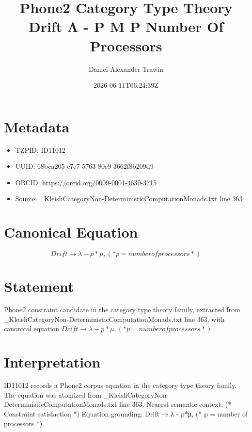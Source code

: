 \documentclass[11pt]{article}
\title{Phone2 Category Type Theory Drift Λ - P Μ P Number Of Processors}
\author{Daniel Alexander Trawin}
\date{2026-06-11T06:24:39Z}
\begin{document}
\maketitle
\section*{Metadata}
\begin{itemize}
\item TZPID: ID11012
\item UUID: 68bca205-c7c7-5763-80e9-3662f8b209d9
\item ORCID: \url{https://orcid.org/0009-0001-4630-3715}
\item Source: _KleisliCategoryNon-DeterministicComputationMonads.txt line 363
\end{itemize}
\section*{Canonical Equation}
\[
Drift → λ - p*μ, (* p = number of processors *)
\]
\section*{Statement}
Phone2 constraint candidate in the category type theory family, extracted from _KleisliCategoryNon-DeterministicComputationMonads.txt line 363, with canonical equation $Drift → λ - p*μ, (* p = number of processors *)$.
\section*{Interpretation}
ID11012 records a Phone2 corpus equation in the category type theory family. The equation was atomized from _KleisliCategoryNon-DeterministicComputationMonads.txt line 363. Nearest semantic context: (* Constraint satisfaction *) Equation grounding: Drift → λ - p*μ, (* p = number of processors *)
\end{document}
